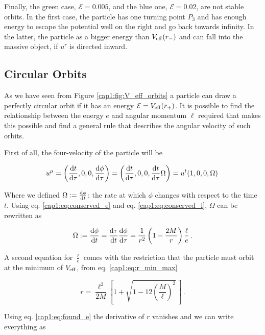 Finally, the green case, $\mathcal E = 0.005$, and the blue one,
$\mathcal E = 0.02$, are not stable orbits.
In the first case, the particle has one turning point $P_3$ and has enough
energy to escape the potential well on the right and go back towards infinity.
In the latter, the particle as a bigger energy than $V_{\rm eff} (r_-)$
and can fall into the massive object, if $u^r$ is directed inward.


\subsection{Circular Orbits}
\label{cap1:ssec:circular_orbits}

As we have seen from Figure \ref{cap1:fig:V_eff_orbits} a particle can draw a
perfectly circular orbit if it has an energy $\mathcal E = V_{\rm eff}(r_+)$.
It is possible to find the relationship between the energy $e$
and angular momentum $\ell$ required that makes this possible and find a
general rule that describes the angular velocity of such orbits.

First of all, the four-velocity of the particle will be

\begin{equation}
    u^\mu = \left(\dv{t}{\tau}, 0, 0, \dv{\phi}{\tau} \right)
    = \left(\dv{t}{\tau}, 0, 0, \dv{t}{\tau} \Omega \right)
    = u^t (1, 0, 0, \Omega) \,
    \label{cap1:eq:circular_orbit_u}
\end{equation}

Where we defined $\Omega := \dv{\phi}{t}$: the rate at which $\phi$ changes with
respect to the \Sh time $t$.
Using eq. \ref{cap1:eq:conserved_e} and eq. \ref{cap1:eq:conserved_l}, $\Omega$
can be rewritten as

\begin{equation}
    \Omega := \dv{\phi}{t} = \dv{\tau}{t} \dv{\phi}{\tau} =
    \frac{1}{r^2} \left(1 - \frac{2M}{r} \right) \frac{\ell}{e}\, .
    \label{cap1:eq:Omega}
\end{equation}

A second equation for $\frac{\ell}{e}$ comes with the restriction that the
particle must orbit at the minimum of $V_{\rm eff}$, from eq.
\ref{cap1:eq:r_min_max}

\begin{equation}
    r = \frac{\ell^2}{2 M} \left[1 +
    \sqrt{1 - 12 \left( \frac{M}{\ell} \right)^2} \, \right] \, .
    \label{cap1:eq:r_min}
\end{equation}

Using eq. \ref{cap1:eq:found_e} the derivative of $r$ vanishes
and we can write everything as

